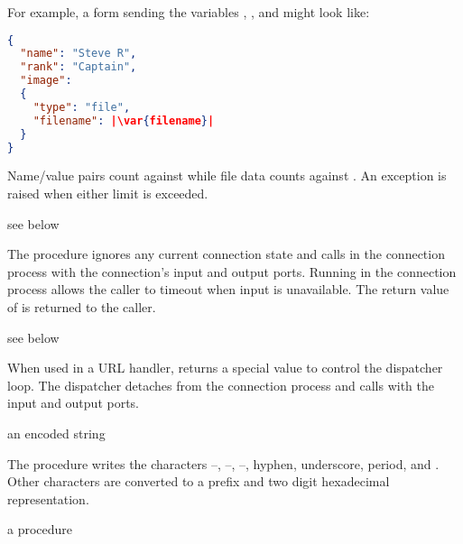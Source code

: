 For example, a form sending the variables , ,
and  might look like:

\begin{lstlisting}[language=json,frame=none]
{
  "name": "Steve R",
  "rank": "Captain",
  "image":
  {
    "type": "file",
    "filename": |\var{filename}|
  }
}
\end{lstlisting}

Name/value pairs count against  while file data
counts against . An exception is raised when either
limit is exceeded.

\begin{procedure}
\end{procedure}
\returns {} see below

The  procedure ignores any current
connection state and calls  in the connection process with the
connection's input and output ports.  Running  in the
connection process allows the caller to timeout when input is
unavailable. The return value of  is returned to the caller.

\begin{procedure}
\end{procedure}
\returns {} see below

When used in a URL handler,  returns a
special value to control the dispatcher loop. The dispatcher detaches
from the connection process and calls  with the input and
output ports.

\begin{procedure}
\end{procedure}
\returns{} an encoded string

The  procedure writes the characters
--, --,
--, hyphen, underscore, period, and
\code{\~}. Other characters are converted to a \code{\%} prefix
and two digit hexadecimal representation.

\begin{procedure}
\end{procedure}
\returns{} a procedure \alt{} 

